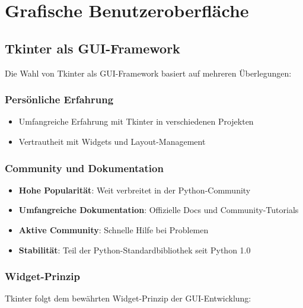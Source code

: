 \documentclass[12pt,a4paper]{article}
\begin{document}
    

\section{Grafische Benutzeroberfläche}

\subsection{Tkinter als GUI-Framework}

Die Wahl von Tkinter als GUI-Framework basiert auf mehreren Überlegungen:

\subsubsection{Persönliche Erfahrung}
\begin{itemize}
    \item Umfangreiche Erfahrung mit Tkinter in verschiedenen Projekten
    \item Vertrautheit mit Widgets und Layout-Management
\end{itemize}

\subsubsection{Community und Dokumentation}
\begin{itemize}
    \item \textbf{Hohe Popularität}: Weit verbreitet in der Python-Community
    \item \textbf{Umfangreiche Dokumentation}: Offizielle Docs und Community-Tutorials
    \item \textbf{Aktive Community}: Schnelle Hilfe bei Problemen
    \item \textbf{Stabilität}: Teil der Python-Standardbibliothek seit Python 1.0
\end{itemize}

\subsubsection{Widget-Prinzip}
Tkinter folgt dem bewährten Widget-Prinzip der GUI-Entwicklung:
\end{document}
